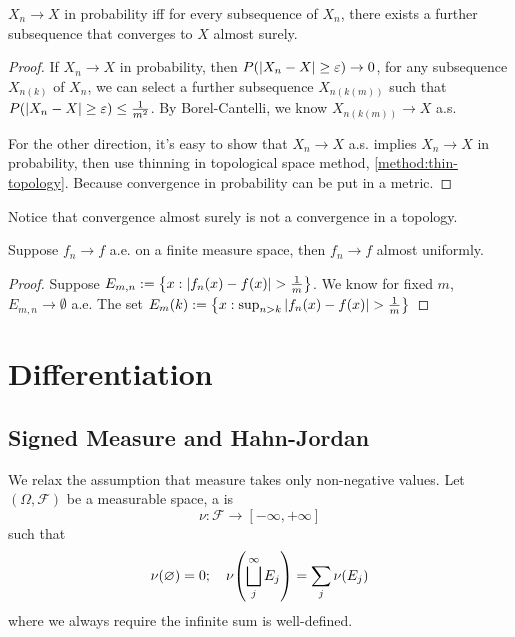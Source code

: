 \begin{thm}
    \(X_{n} \to X\) in probability iff for every subsequence of \(X_{n}\), there exists a further subsequence that converges to \(X\) almost surely. 
\end{thm}
\begin{proof}
    If \(X_{n}\to X\) in probability, then \(P\pqty{\abs{X_{n} - X} \geq \epsilon} \to 0\), for any subsequence \(X_{n(k)}\) of \(X_{n}\), we can select a further subsequence \(X_{n(k(m))}\) such that \(P \pqty{\abs{X_{n} - X} \geq \epsilon} \leq \frac{1}{m^{2}}\). By Borel-Cantelli, we know \(X_{n(k(m))} \to X\) a.s. 

    For the other direction, it's easy to show that \(X_{n} \to X\) a.s. implies \(X_{n}\to X\) in probability, then use thinning in topological space method, \autoref{method:thin-topology}. Because convergence in probability can be put in a metric.
\end{proof}
\begin{remark}
    Notice that convergence almost surely is not a convergence in a topology. 
\end{remark}

\begin{thm}
    Suppose \(f_{n} \to f\) a.e. on a finite measure space, then \(f_{n} \to f\) almost uniformly. 
\end{thm}
\begin{proof}
    Suppose \(E_{m,n} := \Bqty{x: \abs{f_{n}(x) - f(x)} > \frac{1}{m}}\). We know for fixed \(m\), \(E_{m,n} \to \emptyset\) a.e. The set \(E_{m}(k):= \Bqty{x: \sup_{n > k} \abs{f_{n}(x) - f(x)} > \frac{1}{m}} \)  
\end{proof}


\section{Differentiation}

\subsection{Signed Measure and Hahn-Jordan} 

We relax the assumption that measure takes only non-negative values. Let \((\Omega, \mathcal{F})\) be a measurable space, a  is \begin{equation*}
    \nu: \mathcal{F} \to [-\infty,+ \infty]
\end{equation*}
such that 
\begin{equation*}
    \nu\pqty{\emptyset} = 0; \quad \nu\pqty{\bigsqcup_{j}^{\infty} E_{j}} = \sum_{j} \nu\pqty{E_{j}} 
\end{equation*}
where we always require the infinite sum is well-defined. 

